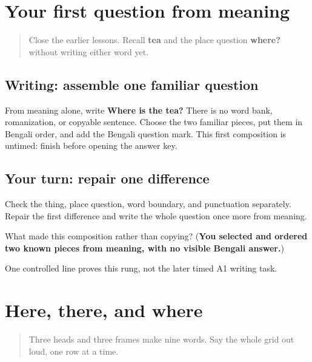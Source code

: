 \section[\texorpdfstring{\bn{চা} \bn{কোথায়}? (chā kothāy?)}{চা কোথায়? (chā kothāy?)}]{Your first question from meaning}

\label{lesson:BN-W26-kothay-controlled-question}



\begin{quote}
Close the earlier lessons. Recall \textbf{tea} and the place question \textbf{where?} without writing either word yet.
\end{quote}

\subsection*{Writing: assemble one familiar question}
From meaning alone, write \textbf{Where is the tea?} There is no word bank, romanization, or copyable sentence. Choose the two familiar pieces, put them in Bengali order, and add the Bengali question mark. This first composition is untimed: finish before opening the answer key.

\subsection*{Your turn: repair one difference}
Check the thing, place question, word boundary, and punctuation separately. Repair the first difference and write the whole question once more from meaning.

\begin{tcolorbox}[breakable,colback=teal!4,colframe=teal!35!black,title={Before you move on}]
What made this composition rather than copying? (\textbf{You selected and ordered two known pieces from meaning, with no visible Bengali answer.})

One controlled line proves this rung, not the later timed A1 writing task.
\end{tcolorbox}
\section[\texorpdfstring{\bn{এখানে} · \bn{ওখানে} … (ekhāne · okhāne …)}{এখানে · ওখানে … (ekhāne · okhāne …)}]{Here, there, and where}

\label{lesson:BN-R26-here-there-where}



\begin{quote}
Three heads and three frames make nine words. Say the whole grid out loud, one row at a time.
\end{quote}

